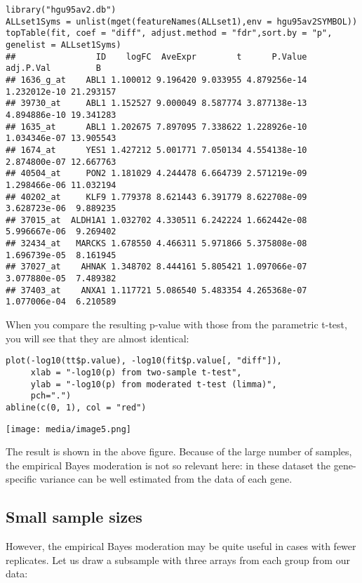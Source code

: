 \begin{verbatim}
library("hgu95av2.db")
ALLset1Syms = unlist(mget(featureNames(ALLset1),env = hgu95av2SYMBOL))
topTable(fit, coef = "diff", adjust.method = "fdr",sort.by = "p", genelist = ALLset1Syms)
##                ID    logFC  AveExpr        t      P.Value    adj.P.Val         B
## 1636_g_at    ABL1 1.100012 9.196420 9.033955 4.879256e-14 1.232012e-10 21.293157
## 39730_at     ABL1 1.152527 9.000049 8.587774 3.877138e-13 4.894886e-10 19.341283
## 1635_at      ABL1 1.202675 7.897095 7.338622 1.228926e-10 1.034346e-07 13.905543
## 1674_at      YES1 1.427212 5.001771 7.050134 4.554138e-10 2.874800e-07 12.667763
## 40504_at     PON2 1.181029 4.244478 6.664739 2.571219e-09 1.298466e-06 11.032194
## 40202_at     KLF9 1.779378 8.621443 6.391779 8.622708e-09 3.628723e-06  9.889235
## 37015_at  ALDH1A1 1.032702 4.330511 6.242224 1.662442e-08 5.996667e-06  9.269402
## 32434_at   MARCKS 1.678550 4.466311 5.971866 5.375808e-08 1.696739e-05  8.161945
## 37027_at    AHNAK 1.348702 8.444161 5.805421 1.097066e-07 3.077880e-05  7.489382
## 37403_at    ANXA1 1.117721 5.086540 5.483354 4.265368e-07 1.077006e-04  6.210589
\end{verbatim}

When you compare the resulting p-value with those from the parametric
t-test, you will see that they are almost identical:

\begin{verbatim}
plot(-log10(tt$p.value), -log10(fit$p.value[, "diff"]),
     xlab = "-log10(p) from two-sample t-test",
     ylab = "-log10(p) from moderated t-test (limma)",
     pch=".")
abline(c(0, 1), col = "red")
\end{verbatim}

\texttt{[image: media/image5.png]}

The result is shown in the above figure. Because of the large number of
samples, the empirical Bayes moderation is not so relevant here: in
these dataset the gene-specific variance can be well estimated from the
data of each gene.

\hypertarget{small-sample-sizes}{%
\subsection{Small sample sizes}\label{small-sample-sizes}}

However, the empirical Bayes moderation may be quite useful in cases
with fewer replicates. Let us draw a subsample with three arrays from
each group from our data:

